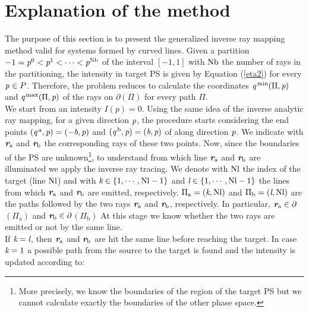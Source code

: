 \section{Explanation of the method}\label{sec:raymapping_explanation}
The purpose of this section is to present the generalized inverse ray mapping method valid for systems formed by curved lines. 
Given a partition $-1 = \textit{p}^0<\textit{p}^1<\cdots<\textit{p}^{\textrm{Nb}}$ of the interval $[-1,1]$ with $\textrm{Nb}$ the number of rays in the partitioning, the intensity in target PS is given by Equation (\ref{eta2}) for every $\textit{p}_{\textrm{} \textit{}}\in P$.
Therefore, the problem reduces to calculate the coordinates 
$\textit{q}^{\textrm{\,min}}(\Pi, \textit{p})$ and $\textit{q}^{\textrm{\,max}}(\Pi, \textit{p})$ of the rays on $\partial$$(\Pi)$ for every path $\Pi$.\\ \indent 
We start from an intensity $I(p)=0$. Using the same idea of the inverse analytic ray mapping, for a given direction $\textit{p}$, the procedure starts considering the end points $(\textit{q}^{\,\textrm{a}}, \textit{p})= (-\textit{b}, \textit{p})$ and $(\textit{q}^{\,\textrm{b}}, \textit{p}) = (\textit{b}, \textit{p})$ of  along direction $\textit{p}$. We indicate with $\textit{\textbf{r}}_{\textrm{a}}$ and $\textit{\textbf{r}}_{\textrm{b}}$ the corresponding rays of these two points. Now, since the boundaries of the PS are unknown\footnote{More precisely, we know the boundaries of the region of the target PS but we cannot calculate exactly the boundaries of the other phase space.}, to understand from which line $\textit{\textbf{r}}_{\textrm{a}}$ and $\textit{\textbf{r}}_{\textrm{b}}$ are illuminated we apply the inverse ray tracing. We denote with $\textrm{Nl}$ the index of the target (line $\textrm{Nl}$) and with $\textit{k}\in\{1,\cdots, \textrm{Nl}-1\}$ and $\textit{l}\in\{1,\cdots, \textrm{Nl}-1\}$ the lines from which $\textit{\textbf{r}}_{\textrm{a}}$ and $\textit{\textbf{r}}_{\textrm{b}}$ are emitted, respectively. $\Pi_\textrm{a} = (\textit{k}, \textrm{Nl})$ and $\Pi_\textrm{b} = (\textit{l},\textrm{Nl})$ are the paths followed by the two rays $\textit{\textbf{r}}_{\textrm{a}}$ and $\textit{\textbf{r}}_{\textrm{b}}$, respectively. In particular, $\textit{\textbf{r}}_{\textrm{a}}\in\partial$$(\Pi_{\textrm{a}})$ and $\textit{\textbf{r}}_{\textrm{b}}\in\partial$$(\Pi_{\textrm{b}})$ At this stage we know whether the two rays are emitted or not by the same line. \\ \indent 
If $\textit{k}= \textit{l}$, then $\textit{\textbf{r}}_{\textrm{a}}$ and $\textit{\textbf{r}}_{\textrm{b}}$ are hit the same line before reaching the target. 
In case $\textit{k} = 1$ a possible path from the source to the target is found and the intensity is updated according to:
